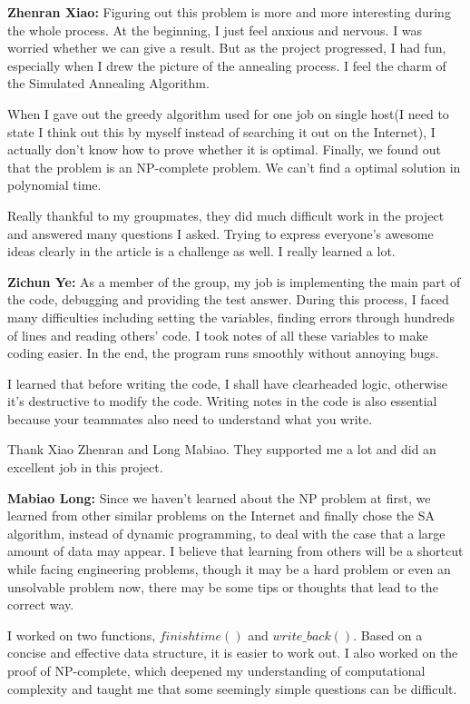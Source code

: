 \documentclass{llncs}
\begin{document}
	\textbf{Zhenran Xiao:} Figuring out this problem is more and more interesting during the whole process. At the beginning, I just feel anxious and nervous. I was worried whether we can give a result. But as the project progressed, I had fun, especially when I drew the picture of the annealing process. I feel the charm of the Simulated Annealing Algorithm. 
	
	When I gave out the greedy algorithm used for one job on single host(I need to state I think out this by myself instead of searching it out on the Internet), I actually don't know how to prove whether it is optimal. Finally, we found out that the problem is an NP-complete problem. We can't find a optimal solution in polynomial time. 
	
	Really thankful to my groupmates, they did much difficult work in the project and answered many questions I asked. Trying to express everyone's awesome ideas clearly in the article is a challenge as well. I really learned a lot.
	
	\textbf{Zichun Ye:} As a member of the group, my job is implementing the main part of the code, debugging and providing the test answer. During this process, I faced many difficulties including setting the variables, finding errors through hundreds of lines and reading others’ code. I took notes of all these variables to make coding easier. In the end, the program runs smoothly without annoying bugs. 
	
	I learned that before writing the code, I shall have clearheaded logic, otherwise it’s destructive to modify the code. Writing notes in the code is also essential because your teammates also need to understand what you write. 
	
	Thank Xiao Zhenran and Long Mabiao. They supported me a lot and did an excellent job in this project.
	
	\textbf{Mabiao Long:} Since we haven’t learned about the NP problem at first, we learned from other similar problems on the Internet and finally chose the SA algorithm, instead of dynamic programming, to deal with the case that a large amount of data may appear. I believe that learning from others will be a shortcut while facing engineering problems, though it may be a hard problem or even an unsolvable problem now, there may be some tips or thoughts that lead to the correct way. 
	
	I worked on two functions, $finishtime()$ and $write\_back()$. Based on a concise and effective data structure, it is easier to work out. I also worked on the proof of NP-complete, which deepened my understanding of computational complexity and taught me that some seemingly simple questions can be difficult.
	
\end{document}
